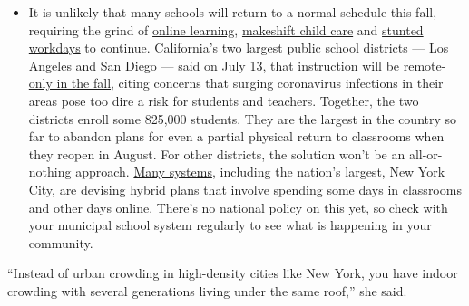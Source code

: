 \begin{itemize}
  \begin{itemize}
  \tightlist
  \item
    It is unlikely that many schools will return to a normal schedule
    this fall, requiring the grind of
    \href{https://www.nytimes3xbfgragh.onion/2020/06/05/us/coronavirus-education-lost-learning.html?action=click\&pgtype=Article\&state=default\&region=MAIN_CONTENT_3\&context=storylines_faq}{online
    learning},
    \href{https://www.nytimes3xbfgragh.onion/2020/05/29/us/coronavirus-child-care-centers.html?action=click\&pgtype=Article\&state=default\&region=MAIN_CONTENT_3\&context=storylines_faq}{makeshift
    child care} and
    \href{https://www.nytimes3xbfgragh.onion/2020/06/03/business/economy/coronavirus-working-women.html?action=click\&pgtype=Article\&state=default\&region=MAIN_CONTENT_3\&context=storylines_faq}{stunted
    workdays} to continue. California's two largest public school
    districts --- Los Angeles and San Diego --- said on July 13, that
    \href{https://www.nytimes3xbfgragh.onion/2020/07/13/us/lausd-san-diego-school-reopening.html?action=click\&pgtype=Article\&state=default\&region=MAIN_CONTENT_3\&context=storylines_faq}{instruction
    will be remote-only in the fall}, citing concerns that surging
    coronavirus infections in their areas pose too dire a risk for
    students and teachers. Together, the two districts enroll some
    825,000 students. They are the largest in the country so far to
    abandon plans for even a partial physical return to classrooms when
    they reopen in August. For other districts, the solution won't be an
    all-or-nothing approach.
    \href{https://bioethics.jhu.edu/research-and-outreach/projects/eschool-initiative/school-policy-tracker/}{Many
    systems}, including the nation's largest, New York City, are
    devising
    \href{https://www.nytimes3xbfgragh.onion/2020/06/26/us/coronavirus-schools-reopen-fall.html?action=click\&pgtype=Article\&state=default\&region=MAIN_CONTENT_3\&context=storylines_faq}{hybrid
    plans} that involve spending some days in classrooms and other days
    online. There's no national policy on this yet, so check with your
    municipal school system regularly to see what is happening in your
    community.
  \end{itemize}
\end{itemize}

``Instead of urban crowding in high-density cities like New York, you
have indoor crowding with several generations living under the same
roof,'' she said.

